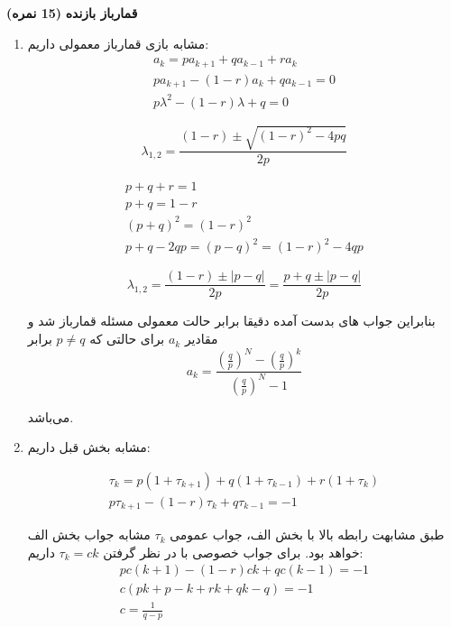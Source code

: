 \Large \textbf{قمارباز بازنده}
\large \textbf{(15 نمره)}

\normalsize \vspace{0.5cm}

\begin{enumerate}[label=(\alph*)]
	\item
	مشابه بازی قمارباز معمولی داریم:
	$$
	\begin{array}{c}
		{a_k} = p{a_{k + 1}} + q{a_{k - 1}} + r{a_k}\\
		p{a_{k + 1}} - \left( {1 - r} \right){a_k} + q{a_{k - 1}} = 0\\
		p{\lambda ^2} - \left( {1 - r} \right)\lambda  + q = 0
	\end{array}
	$$
	
	$$
	{\lambda _{1,2}} = \frac{{\left( {1 - r} \right) \pm \sqrt {{{\left( {1 - r} \right)}^2} - 4pq} }}{{2p}}
	$$
	
	$$
	\begin{array}{c}
		p + q + r = 1\\
		p + q = 1 - r\\
		{\left( {p + q} \right)^2} = {\left( {1 - r} \right)^2}\\
		p + q - 2qp = {\left( {p - q} \right)^2} = {\left( {1 - r} \right)^2} - 4qp
	\end{array}
	$$
	
	$$
	{\lambda _{1,2}} = \frac{{\left( {1 - r} \right) \pm \left| {p - q} \right|}}{{2p}} = \frac{{p + q \pm \left| {p - q} \right|}}{{2p}}
	$$
	
	بنابراین جواب های بدست آمده دقیقا برابر حالت معمولی مسئله قمارباز شد و مقادیر
	${a_k}$
	برای حالتی که
	$p \ne q$
	برابر
	$$
	{a_k} = \frac{{{{\left( {\frac{q}{p}} \right)}^N} - {{\left( {\frac{q}{p}} \right)}^k}}}{{{{\left( {\frac{q}{p}} \right)}^N} - 1}}
	$$
	
	می‌باشد.
	
	\item
	
	مشابه بخش قبل داریم:
	
	$$
	\begin{array}{c}
		{\tau _k} = p\left( {1 + {\tau _{k + 1}}} \right) + q\left( {1 + {\tau _{k - 1}}} \right) + r\left( {1 + {\tau _k}} \right)\\
		p{\tau _{k + 1}} - \left( {1 - r} \right){\tau _k} + q{\tau _{k - 1}} =  - 1
	\end{array}
	$$
	
	طبق مشابهت رابطه بالا با بخش الف،‌ جواب عمومی
	${\tau _k}$
	مشابه جواب بخش الف خواهد بود. برای جواب خصوصی با در نظر گرفتن
	${\tau _k} = ck$
	داریم:
	$$
	\begin{array}{c}
		pc\left( {k + 1} \right) - \left( {1 - r} \right)ck + qc\left( {k - 1} \right) =  - 1\\
		c\left( {pk + p - k + rk + qk - q} \right) =  - 1\\
		c = \frac{1}{{q - p}}
	\end{array}
	$$
	

\end{enumerate}
